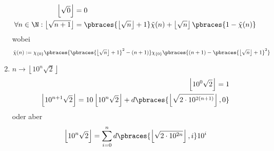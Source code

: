 \begin{solution}
\begin{enumerate}
			\begin{align*}
			\left\lfloor \sqrt{0} \right\rfloor &= 0 \\
			\forall n \in \N : \left\lfloor \sqrt{n + 1} \right\rfloor &= \pbraces{\left\lfloor \sqrt n \right\rfloor + 1} \tilde{\chi}(n) + \left\lfloor \sqrt n \right\rfloor \pbraces{1 - \tilde{\chi}(n)}
			\end{align*}
			wobei
			\begin{align*}
			\tilde{\chi}(n) := \chi_{\{0\}}\pbraces{\pbraces{\left\lfloor \sqrt n \right\rfloor + 1}^2 - (n + 1)} \chi_{\{0\}}\pbraces{(n + 1) - \pbraces{\left\lfloor \sqrt n \right\rfloor + 1}^2}
			\end{align*}
		\item $n \to \left\lfloor 10^n \sqrt{2}  \right\rfloor$
			\begin{align*}
			\left\lfloor 10^0 \sqrt{2}  \right\rfloor = 1 \\
			\left\lfloor 10^{n + 1} \sqrt{2}  \right\rfloor = 10 \left\lfloor 10^n \sqrt{2}  \right\rfloor + d\pbraces{\left \lfloor \sqrt{2 \cdot 10^{2(n + 1)}} \right\rfloor, 0}
			\end{align*}
			oder aber
			\begin{align*}
			\left\lfloor 10^n \sqrt 2 \right\rfloor = \sum_{i = 0}^n d\pbraces{\left \lfloor \sqrt{2 \cdot 10^{2n}} \right\rfloor, i} 10^i
			\end{align*}
	\end{enumerate}

\end{solution}
